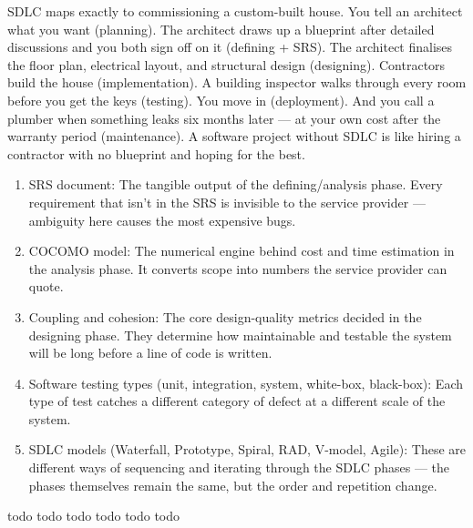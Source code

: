 \documentclass{report}
\begin{document}
\begin{real}
    SDLC maps exactly to commissioning a custom-built house. You tell an architect what you want (planning). The architect draws up a blueprint after detailed discussions and you both sign off on it (defining + SRS). The architect finalises the floor plan, electrical layout, and structural design (designing). Contractors build the house (implementation). A building inspector walks through every room before you get the keys (testing). You move in (deployment). And you call a plumber when something leaks six months later — at your own cost after the warranty period (maintenance). A software project without SDLC is like hiring a contractor with no blueprint and hoping for the best.
\end{real}

\begin{con}
\begin{enumerate}
    \item SRS document: The tangible output of the defining/analysis phase. Every requirement that isn't in the SRS is invisible to the service provider — ambiguity here causes the most expensive bugs.
    \item COCOMO model: The numerical engine behind cost and time estimation in the analysis phase. It converts scope into numbers the service provider can quote.
    \item Coupling and cohesion: The core design-quality metrics decided in the designing phase. They determine how maintainable and testable the system will be long before a line of code is written.
    \item Software testing types (unit, integration, system, white-box, black-box): Each type of test catches a different category of defect at a different scale of the system.
    \item SDLC models (Waterfall, Prototype, Spiral, RAD, V-model, Agile): These are different ways of sequencing and iterating through the SDLC phases — the phases themselves remain the same, but the order and repetition change.
\end{enumerate}
\end{con}

\sol todo
\sol todo
\sol todo
\sol todo
\sol todo
\sol todo
\end{document}
